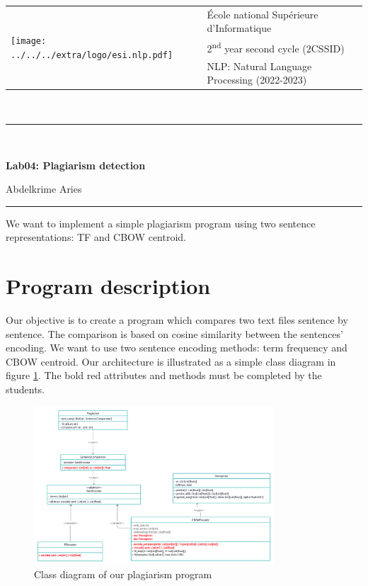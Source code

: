 \documentclass[11pt, a4paper]{article}
\begin{document}

\noindent
\begin{tabular}{ll}
\multirow{3}{*}{\texttt{[image: ../../../extra/logo/esi.nlp.pdf]}} & \'Ecole national Supérieure d'Informatique\\
& 2\textsuperscript{nd} year second cycle (2CSSID)\\
& NLP: Natural Language Processing (2022-2023)
\end{tabular}\\[.25cm]
\noindent\rule{\textwidth}{2pt}\\[-0.5cm]
\begin{center}
{\LARGE \textbf{Lab04: Plagiarism detection}}
\begin{flushright}
	Abdelkrime Aries
\end{flushright}
\end{center}\vspace{-0.5cm}
\noindent\rule{\textwidth}{2pt}

We want to implement a simple plagiarism program using two sentence representations: TF and CBOW centroid. 

\section{Program description}

Our objective is to create a program which compares two text files sentence by sentence.
The comparison is based on cosine similarity between the sentences' encoding.
We want to use two sentence encoding methods: term frequency and CBOW centroid.
Our architecture is illustrated as a simple class diagram in figure \ref{fig:program}.
The bold red attributes and methods must be completed by the students. 

\begin{figure}[htp!]
	\centering
	\includegraphics[width=0.8\textwidth]{./Lab4.png}
	\caption{Class diagram of our plagiarism program}
	\label{fig:program}
\end{figure}
\end{document}

